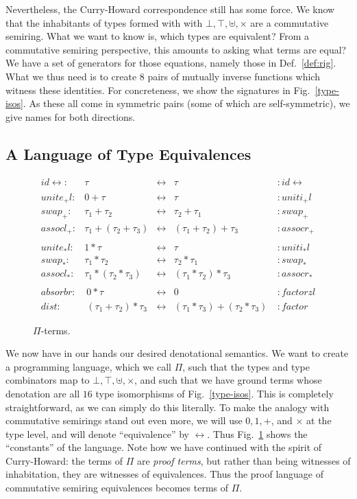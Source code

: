 \documentclass{article}
\newcommand{\identlp}{\mathit{unite}_+\mathit{l}}
\newcommand{\identrp}{\mathit{uniti}_+\mathit{l}}
\newcommand{\swapp}{\mathit{swap}_+}
\newcommand{\assoclp}{\mathit{assocl}_+}
\newcommand{\assocrp}{\mathit{assocr}_+}
\newcommand{\identlt}{\mathit{unite}_*\mathit{l}}
\newcommand{\identrt}{\mathit{uniti}_*\mathit{l}}
\newcommand{\swapt}{\mathit{swap}_*}
\newcommand{\assoclt}{\mathit{assocl}_*}
\newcommand{\assocrt}{\mathit{assocr}_*}
\newcommand{\factorzl}{\mathit{factorzl}}
\newcommand{\dist}{\mathit{dist}}
\newcommand{\factor}{\mathit{factor}}
\newcommand{\distz}{\mathit{absorbr}}
\newcommand{\iso}{\leftrightarrow}
\newcommand{\idc}{\mathit{id}\!\!\leftrightarrow}
\begin{document}
Nevertheless, the Curry-Howard correspondence still has some force. We
know that the inhabitants of types formed with with
$\bot, \top, \uplus, \times$ are a commutative semiring. What we want
to know is, which types are equivalent? From a commutative semiring
perspective, this amounts to asking what terms are equal?  We have a
set of generators for those equations, namely those in
Def.~\ref{def:rig}. What we thus need is to create $8$ pairs of
mutually inverse functions which witness these identities.  For
concreteness, we show the signatures in Fig.~\ref{type-isos}.  As
these all come in symmetric pairs (some of which are self-symmetric),
we give names for both directions. 

\subsection{A Language of Type Equivalences} 

\begin{figure}[t]
\[
\begin{array}{rrcll}
\idc :& \tau & \iso & \tau &: \idc \\
\\
\identlp :&  0 + \tau & \iso & \tau &: \identrp \\
\swapp :&  \tau_1 + \tau_2 & \iso & \tau_2 + \tau_1 &: \swapp \\
\assoclp :&  \tau_1 + (\tau_2 + \tau_3) & \iso & (\tau_1 + \tau_2) + \tau_3 &: \assocrp \\
\\
\identlt :&  1 * \tau & \iso & \tau &: \identrt \\
\swapt :&  \tau_1 * \tau_2 & \iso & \tau_2 * \tau_1 &: \swapt \\
\assoclt :&  \tau_1 * (\tau_2 * \tau_3) & \iso & (\tau_1 * \tau_2) * \tau_3 &: \assocrt \\
\\
\distz :&~ 0 * \tau & \iso & 0 ~ &: \factorzl \\
\dist :&~ (\tau_1 + \tau_2) * \tau_3 & \iso & (\tau_1 * \tau_3) + (\tau_2 * \tau_3)~ &: \factor
\end{array}
\]
\caption{$\Pi$-terms.}
\label{pi-terms}
\end{figure}

We now have in our hands our desired denotational semantics. We want
to create a programming language, which we call $\Pi$, such that the
types and type combinators map to $\bot, \top, \uplus, \times$, and
such that we have ground terms whose denotation are all $16$ type
isomorphisms of Fig.~\ref{type-isos}. This is completely
straightforward, as we can simply do this literally. To make the
analogy with commutative semirings stand out even more, we will use
$0, 1, +$, and $\times$ at the type level, and will denote
``equivalence'' by $\iso$.  Thus Fig.~\ref{pi-terms} shows the
``constants'' of the language. Note how we have continued with
the spirit of Curry-Howard: the terms of $\Pi$ are \emph{proof terms},
but rather than being witnesses of inhabitation, they are witnesses of
equivalences. Thus the proof language of commutative semiring equivalences
becomes terms of $\Pi$.
\end{document}
